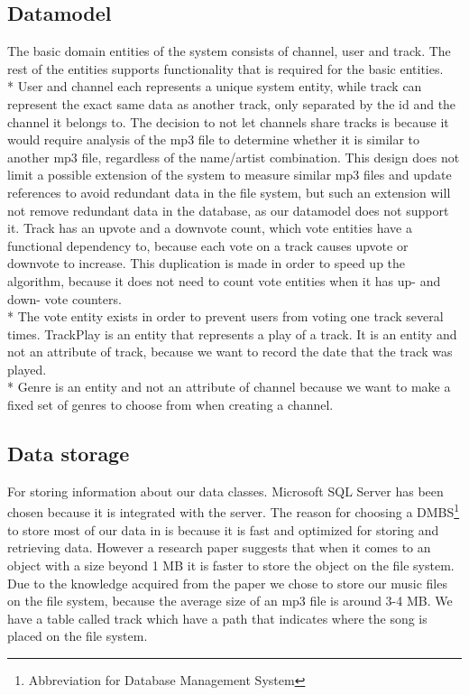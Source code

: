 \documentclass[a4paper,11pt,report]{article}
\begin{document}
\subsection{Datamodel}
The basic domain entities of the system consists of channel, user and track. The rest of the entities supports functionality that is required for the basic entities. \\*
User and channel each represents a unique system entity, while track can represent the exact same data as another track, only separated by the id and the channel it belongs to.
The decision to not let channels share tracks is because it would require analysis of the mp3 file to determine whether it is similar to another mp3 file, regardless of the name/artist combination.
This design does not limit a possible extension of the system to measure similar mp3 files and update references to avoid redundant data in the file system, but such an extension will not remove redundant data in the database, as our datamodel does not support it. 
Track has an upvote and a downvote count, which vote entities have a functional dependency to, because each vote on a track causes upvote or downvote to increase. This duplication is made in order to speed up the algorithm, because it does not need to count vote entities when it has up- and down- vote counters. \\*
The vote entity exists in order to prevent users from voting one track several times.
TrackPlay is an entity that represents a play of a track. It is an entity and not an attribute of track, because we want to record the date that the track was played. \\*
Genre is an entity and not an attribute of channel because we want to make a fixed set of genres to choose from when creating a channel.

\subsection{Data storage}
For storing information about our data classes. Microsoft SQL Server has been chosen because it is integrated with the server. The reason for choosing a DMBS\footnote[1]{Abbreviation for Database Management System} to store most of our data in is because it is fast and optimized for storing and retrieving data. However a research paper\cite{Russel} suggests that when it comes to an object with a size beyond 1 MB it is faster to store the object on the file system. Due to the knowledge acquired from the paper we chose to store our music files on the file system, because the average size of an mp3 file is around 3-4 MB. We have a table called track which have a path that indicates where the song is placed on the file system.
\end{document}
